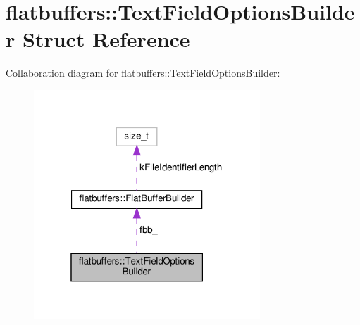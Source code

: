 \hypertarget{structflatbuffers_1_1TextFieldOptionsBuilder}{}\section{flatbuffers\+:\+:Text\+Field\+Options\+Builder Struct Reference}
\label{structflatbuffers_1_1TextFieldOptionsBuilder}


Collaboration diagram for flatbuffers\+:\+:Text\+Field\+Options\+Builder\+:
\nopagebreak
\begin{figure}[H]
\begin{center}
\leavevmode
\includegraphics[width=241pt]{structflatbuffers_1_1TextFieldOptionsBuilder__coll__graph}
\end{center}
\end{figure}
